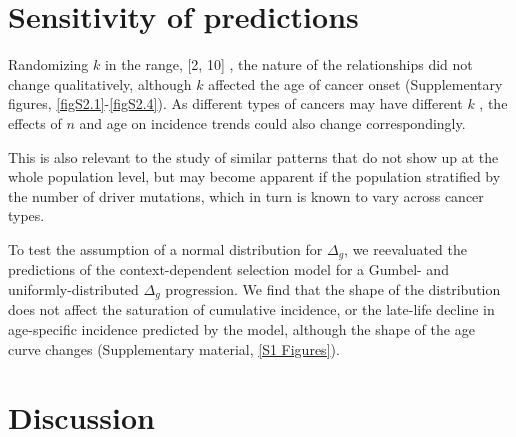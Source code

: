 \documentclass[10pt,twocolumn,twoside]{article}
\begin{document}
\section{Sensitivity of predictions}

Randomizing $k$ in the range, [2, 10] \cite{Martincorena2017}, the nature of the relationships did not change qualitatively, although $k$ affected the age of cancer onset (Supplementary figures, \ref{figS2.1}-\ref{figS2.4}). As different types of cancers may have different $k$ \cite{Nunney2015}, the effects of $n$ and age on incidence trends could also change correspondingly. 

This is also relevant to the study of similar patterns that do not show up at the whole population level, but may become apparent if the population stratified by the number of driver mutations, which in turn is known to vary across cancer types.

To test the assumption of a normal distribution for $\Delta_{g}$, we reevaluated the predictions of the context-dependent selection model for a Gumbel- and uniformly-distributed $\Delta_{g}$ progression. We find that the shape of the distribution does not affect the saturation of cumulative incidence, or the late-life decline in age-specific incidence predicted by the model, although the shape of the age curve changes (Supplementary material, \ref{S1 Figures}).

\section{Discussion}
\end{document}

